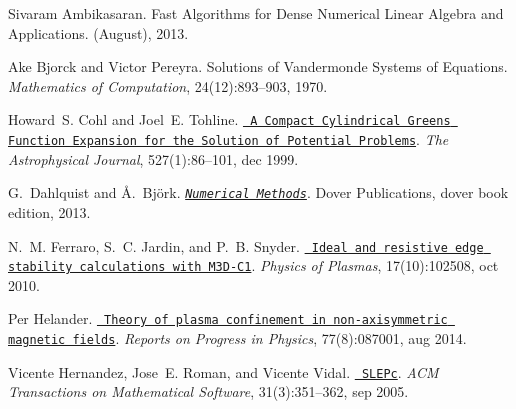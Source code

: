 
\begin{DoxyDescription}
\item[\label{citelist_CITEREF_Ambikasaran2013}%
\Hypertarget{citelist_CITEREF_Ambikasaran2013}%
\mbox{[}1\mbox{]}]Sivaram Ambikasaran. Fast Algorithms for Dense Numerical Linear Algebra and Applications. (August), 2013.


\item[\label{citelist_CITEREF_Bjorck1970}%
\Hypertarget{citelist_CITEREF_Bjorck1970}%
\mbox{[}2\mbox{]}]Ake Bjorck and Victor Pereyra. Solutions of Vandermonde Systems of Equations. {\itshape Mathematics of Computation}, 24(12)\+:893--903, 1970.


\item[\label{citelist_CITEREF_Cohl1999}%
\Hypertarget{citelist_CITEREF_Cohl1999}%
\mbox{[}3\mbox{]}]Howard~S. Cohl and Joel~E. Tohline. \href{http://stacks.iop.org/0004-637X/527/i=1/a=86}{\texttt{ A Compact Cylindrical Green\textquotesingle{}s Function Expansion for the Solution of Potential Problems}}. {\itshape The Astrophysical Journal}, 527(1)\+:86--101, dec 1999. 


\item[\label{citelist_CITEREF_dahlquist2003numerical}%
\Hypertarget{citelist_CITEREF_dahlquist2003numerical}%
\mbox{[}4\mbox{]}]G.~Dahlquist and \AA.~Bj\"{o}rk. \href{http://books.google.es/books?id=armfeHpJIwAC}{\texttt{ {\itshape Numerical Methods}}}. Dover Publications, dover book edition, 2013.


\item[\label{citelist_CITEREF_ferraro2010ELMbenchmark}%
\Hypertarget{citelist_CITEREF_ferraro2010ELMbenchmark}%
\mbox{[}5\mbox{]}]N.~M. Ferraro, S.~C. Jardin, and P.~B. Snyder. \href{http://aip.scitation.org/doi/10.1063/1.3492727}{\texttt{ Ideal and resistive edge stability calculations with M3\+D-\/\+C1}}. {\itshape Physics of Plasmas}, 17(10)\+:102508, oct 2010. 


\item[\label{citelist_CITEREF_Helander2014}%
\Hypertarget{citelist_CITEREF_Helander2014}%
\mbox{[}6\mbox{]}]Per Helander. \href{http://stacks.iop.org/0034-4885/77/i=8/a=087001?key=crossref.bf6909cc443072b7619599e69fafa0da}{\texttt{ Theory of plasma confinement in non-\/axisymmetric magnetic fields}}. {\itshape Reports on Progress in Physics}, 77(8)\+:087001, aug 2014. 


\item[\label{citelist_CITEREF_Hernandez2005slepc}%
\Hypertarget{citelist_CITEREF_Hernandez2005slepc}%
\mbox{[}7\mbox{]}]Vicente Hernandez, Jose~E. Roman, and Vicente Vidal. \href{http://portal.acm.org/citation.cfm?doid=1089014.1089019}{\texttt{ S\+L\+E\+Pc}}. {\itshape A\+CM Transactions on Mathematical Software}, 31(3)\+:351--362, sep 2005. 



\end{DoxyDescription}
